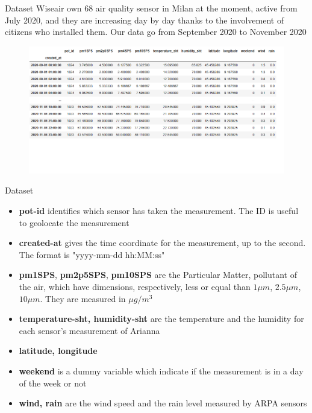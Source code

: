 \documentclass[10pt]{beamer}
\theoremstyle{remark}
\theoremstyle{definition}
\begin{document}
\begin{frame}{Dataset}
    Wiseair own 68 air quality sensor in Milan at the moment, active from July 2020, and they are increasing day by day thanks to the involvement of citizens who installed them. 
    Our data go from September 2020 to November 2020
    \begin{figure}[h]
	\centering
	\includegraphics[width=1\linewidth]{dataset.png}
\end{figure}
\end{frame}

\begin{frame}{Dataset}
\begin{itemize}
    \item < 1 -> \textbf{pot-id} identifies which sensor has taken the measurement. The ID is useful to geolocate the measurement
    \item < 2 -> \textbf{created-at} gives the time coordinate for the measurement, up to the second. The format is "yyyy-mm-dd hh:MM:ss"
    \item < 3 -> \textbf{pm1SPS}, \textbf{pm2p5SPS}, \textbf{pm10SPS} are the Particular Matter, pollutant of the air, which have dimensions, respectively, less or equal than $1 \mu m$, $2.5 \mu m$, $ 10 \mu m$. 
    They are measured in $\mu g/m^{3}$
    \item < 4 -> \textbf{temperature-sht, humidity-sht} are the temperature and the humidity for each sensor's measurement of Arianna
    \item < 5 -> \textbf{latitude, longitude} 
    \item < 6 -> \textbf{weekend} is a dummy variable which indicate if the measurement is in a day of the week or not \item < 7 -> \textbf{wind, rain} are the wind speed and the rain level measured by ARPA sensors 
\end{itemize}
\end{frame}
\end{document}
